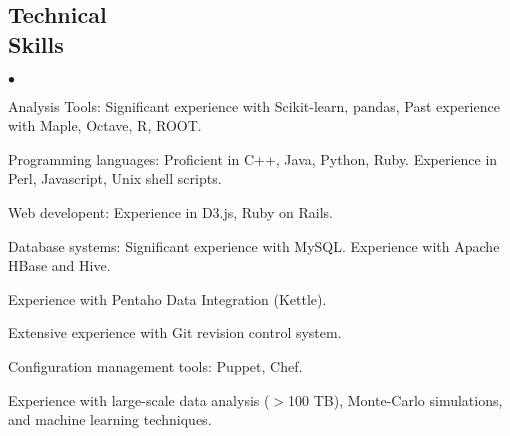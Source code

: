 \documentclass[margin,line]{res}
\newenvironment{list2}{
  \begin{list}{$\bullet$}{%
      \setlength{\itemsep}{0in}
      \setlength{\parsep}{0in} \setlength{\parskip}{0in}
      \setlength{\topsep}{0in} \setlength{\partopsep}{0in}
      \setlength{\leftmargin}{0.2in}}}{\end{list}}
\begin{document}
\begin{resume}
\section{\sc Technical \\ Skills}
\begin{list2}
\item Analysis Tools: Significant experience with Scikit-learn,
  pandas,  Past experience with Maple, Octave, R, ROOT. %
\item Programming languages: Proficient in C++, Java, Python, Ruby.
  Experience in Perl, Javascript, Unix shell scripts.
\item Web developent: Experience in D3.js, Ruby on Rails.
\item Database systems: Significant experience with MySQL. Experience with Apache HBase and Hive.
\item Experience with Pentaho Data Integration (Kettle).
\item Extensive experience with Git revision control system.
\item Configuration management tools: Puppet, Chef.
\item Experience with large-scale data analysis ($>$100 TB), Monte-Carlo simulations,
and machine learning techniques.
\end{list2}




\end{resume}
\end{document}
